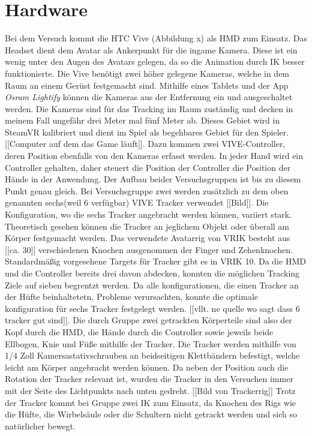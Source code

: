 \section{Hardware}
Bei dem Versuch kommt die HTC Vive (Abbildung x) als HMD zum Einsatz.
Das Headset dient dem Avatar als Ankerpunkt für die ingame Kamera. Diese ist ein wenig unter den Augen des Avatars gelegen, da so die Animation durch IK besser funktionierte.
Die Vive benötigt zwei höher gelegene Kameras, welche in dem Raum an einem Gerüst festgemacht sind. Mithilfe eines Tablets und der App \textit{Osram Lightify} können die Kameras aus der Entfernung ein und ausgeschaltet werden. Die Kameras sind für das Tracking im Raum zuständig und decken in meinem Fall ungefähr drei Meter mal fünf Meter ab. Dieses Gebiet wird in SteamVR kalibriert und dient im Spiel als begehbares Gebiet für den Spieler. [[Computer auf dem das Game läuft]].
Dazu kommen zwei VIVE-Controller, deren Position ebenfalls von den Kameras erfasst werden. In jeder Hand wird ein Controller gehalten, daher steuert die Position der Controller die Position der Hände in der Anwendung.  Der Aufbau beider Versuchsgruppen ist bis zu diesem Punkt genau gleich.
Bei Versuchsgruppe zwei werden zusätzlich zu dem oben genannten sechs(weil 6 verfügbar) VIVE Tracker verwendet [[Bild]]. Die Konfiguration, wo die sechs Tracker angebracht werden können, variiert stark. Theoretisch gesehen können die Tracker an jeglichem Objekt oder überall am Körper festgemacht werden. Das verwendete Avatarrig von VRIK besteht aus [[ca. 30]] verschiedenen Knochen ausgenommen der Finger und Zehenknochen. Standardmäßig vorgesehene Targets für Tracker gibt es in VRIK 10. Da die HMD und die Controller bereits drei davon abdecken, konnten die möglichen Tracking Ziele auf sieben begrentzt werden. Da alle konfigurationen, die einen Tracker an der Hüfte beinhaltetetn, Probleme verursachten, konnte die optimale konfiguration für sechs Tracker festgelegt werden. [[vllt. ne quelle wo sagt dass 6 tracker gut sind]]. Die durch Gruppe zwei getrackten Körperteile sind also der Kopf durch die HMD, die Hände durch die Controller sowie jeweils beide Ellbogen, Knie und Füße mithilfe der Tracker. 
Die Tracker werden mithilfe von 1/4 Zoll Kamersastativschrauben an beidseitigen Klettbändern befestigt, welche leicht am Körper angebracht werden können. Da neben der Position auch die Rotation der Tracker relevant ist, wurden die Tracker in den Versuchen immer mit der Seite des Lichtpunkts nach unten gedreht. [[Bild von Trackerrig]]
Trotz der Tracker kommt bei Gruppe zwei IK zum Einsatz, da Knochen des Rigs wie die Hüfte, die Wirbelsäule oder die Schultern nicht getrackt werden und sich so natürlicher bewegt.

